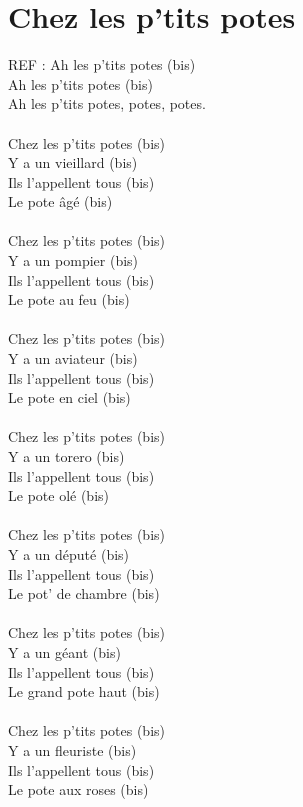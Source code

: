 \section*{Chez les p'tits potes}
REF : Ah les p’tits potes (bis)\\
Ah les p’tits potes (bis)\\
Ah les p’tits potes, potes, potes.\\\\
Chez les p’tits potes (bis)\\
Y a un vieillard (bis)\\
Ils l’appellent tous (bis)\\
Le pote âgé (bis)\\\\
Chez les p’tits potes (bis)\\
Y a un pompier (bis)\\
Ils l’appellent tous (bis)\\
Le pote au feu (bis)\\\\
Chez les p’tits potes (bis)\\
Y a un aviateur (bis)\\
Ils l’appellent tous (bis)\\
Le pote en ciel (bis)\\\\
Chez les p’tits potes (bis)\\
Y a un torero (bis)\\
Ils l’appellent tous (bis)\\
Le pote olé (bis)\\\\
Chez les p’tits potes (bis)\\
Y a un député (bis)\\
Ils l’appellent tous (bis)\\
Le pot’ de chambre (bis)\\\\
Chez les p’tits potes (bis)\\
Y a un géant (bis)\\
Ils l’appellent tous (bis)\\
Le grand pote haut (bis)\\\\
Chez les p’tits potes (bis)\\
Y a un fleuriste (bis)\\
Ils l’appellent tous (bis)\\
Le pote aux roses (bis)\\\\
